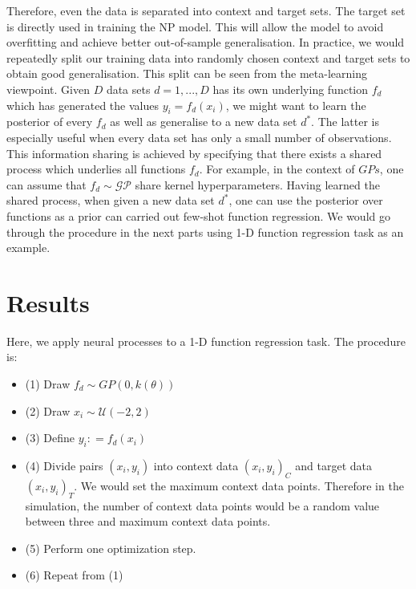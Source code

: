 \documentclass{article}
\begin{document}
Therefore, even the data is separated into context and target sets. The target set is directly used in training the NP model. This will allow the model to avoid overfitting and achieve better out-of-sample generalisation. In practice, we would repeatedly split our training data into randomly chosen context and target sets to obtain good generalisation. This split can be seen from the meta-learning viewpoint. Given $D$ data sets $d = 1,...,D$ has its own underlying function $f_{d}$ which has generated the values $y_{i} = f_d(x_{i})$, we might want to learn the posterior of every $f_{d}$ as well as generalise to a new data set $d^*$. The latter is especially useful when every data set has only a small number of observations. This information sharing is achieved by specifying that there exists a shared process which underlies all functions $f_{d}$. For example, in the context of $GPs$, one can assume that $f_d \sim \mathcal{GP}$ share kernel hyperparameters. Having learned the shared process, when given a new data set $d^{*}$, one can use the posterior over functions as a prior can carried out few-shot function regression. We would go through the procedure in the next parts using 1-D function regression task as an example.


\section{Results}
Here, we apply neural processes to a 1-D function regression task. The procedure is: 
\begin{itemize}
\item (1) Draw $f_d \sim GP(0,k(\theta))$ 
\item (2) Draw $x_{i} \sim \mathcal{U} (-2,2)$ 
\item (3) Define $y_{i} : = f_d(x_{i})$ 
\item (4) Divide pairs $(x_{i},y_{i})$ into context data $(x_{i},y_{i})_{C}$ and target data $(x_{i},y_{i})_{T}$. We would set the maximum context data points. Therefore in the simulation, the number of context data points would be a random value between three and maximum context data points. 
\item (5) Perform one optimization step. 
\item (6) Repeat from (1)
\end{itemize}
\end{document}
